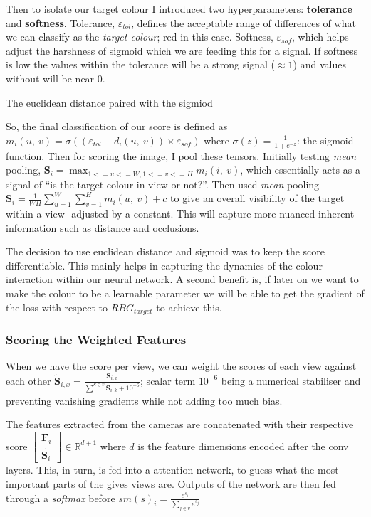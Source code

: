Then to isolate our target colour I introduced two hyperparameters: \textbf{tolerance} and \textbf{softness}. Tolerance, $\varepsilon_{tol}$, defines the acceptable range of differences of what we can classify as the \emph{target colour}; red in this case. Softness, $\varepsilon_{sof}$, which helps adjust the harshness of sigmoid which we are feeding this for a signal. If softness is low the values within the tolerance will be a strong signal ($\approx 1$) and values without will be near $0$. 

The euclidean distance paired with the sigmiod

So, the final classification of our score is defined as \(m_i\left(u, ~v\right) = \sigma \left(\left(\varepsilon_{tol} - d_i\left(u, ~v\right)\right)\times \varepsilon_{sof} \right)\) where \(\sigma\left(z\right) = \frac{1}{1 + e^{-z}}\): the sigmoid function. 
Then for scoring the image, I pool these tensors. Initially testing \emph{mean} pooling, \(\mathbf{S}_i = \max_{1<=u<=W, 1<=v<=H}m_i(i, ~v)\), which essentially acts as a signal of ``is the target colour in view or not?''. Then used \emph{mean} pooling \(\mathbf{S}_i = {\frac{1}{WH}\sum_{u = 1}^{W}\sum_{v = 1}^{H}m_i\left(u, ~v\right)} + c\) to give an overall visibility of the target within a view -adjusted by a constant. This will capture more nuanced inherent information such as distance and occlusions.

The decision to use euclidean distance and sigmoid was to keep the score differentiable. This mainly helps in capturing the dynamics of the colour interaction within our neural network. A second benefit is, if later on we want to make the colour to be a learnable parameter we will be able to get the gradient of the loss with respect to ${RBG}_{target}$ to achieve this.

\subsubsection{Scoring the Weighted Features}
When we have the score per view, we can weight the scores of each view against each other
\( \tilde{\mathbf{S}}_{i, x} = \frac{\mathbf{S}_{i, x}}{\sum_{}^{k \in v} \mathbf{S}_{i, k} + 10^{-6}} \); scalar term $10^{-6}$ being a numerical stabiliser and preventing vanishing gradients while not adding too much bias.

The features extracted from the cameras are concatenated with their respective score \( \begin{bmatrix} \mathbf{F}_i \\ \tilde{\mathbf{S}_i} \end{bmatrix} \in \mathbb{R}^{d + 1}\) where $d$ is the feature dimensions encoded after the conv layers. This, in turn, is fed into a attention network, to guess what the most important parts of the gives views are. Outputs of the network are then fed through a \emph{softmax} before \(sm\left(s\right)_i = \frac{e^{s_i}}{\sum_{j \in v}{e^{s_j}}}\)

